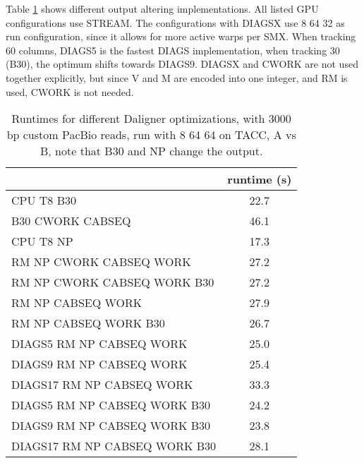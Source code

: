 \documentclass[../thesis.tex]{subfiles}
\begin{document}
Table \ref{tbl:daligner3} shows different output altering implementations.
All listed GPU configurations use STREAM.
The configurations with DIAGSX use 8 64 32 as run configuration, since it allows for more active warps per SMX.
When tracking 60 columns, DIAGS5 is the fastest DIAGS implementation, when tracking 30 (B30), the optimum shifts towards DIAGS9.
DIAGSX and CWORK are not used together explicitly, but since V and M are encoded into one integer, and RM is used, CWORK is not needed.

\begin{table}
\centering
\caption{Runtimes for different Daligner optimizations, with 3000 bp custom PacBio reads, run with 8 64 64 on TACC, A vs B, note that B30 and NP change the output.}
\label{tbl:daligner3}
\begin{tabular}{l c}
& runtime (s) \\ \hline
CPU T8 B30 & 22.7 \\
B30 CWORK CABSEQ & 46.1 \\ \hline
CPU T8 NP & 17.3 \\
RM NP CWORK CABSEQ WORK & 27.2 \\
RM NP CWORK CABSEQ WORK B30 & 27.2 \\
RM NP CABSEQ WORK & 27.9 \\
RM NP CABSEQ WORK B30 & 26.7 \\
DIAGS5 RM NP CABSEQ WORK & 25.0 \\
DIAGS9 RM NP CABSEQ WORK & 25.4 \\
DIAGS17 RM NP CABSEQ WORK & 33.3 \\
DIAGS5 RM NP CABSEQ WORK B30 & 24.2 \\
DIAGS9 RM NP CABSEQ WORK B30 & 23.8 \\
DIAGS17 RM NP CABSEQ WORK B30 & 28.1 \\
\end{tabular}
\end{table}
\end{document}
